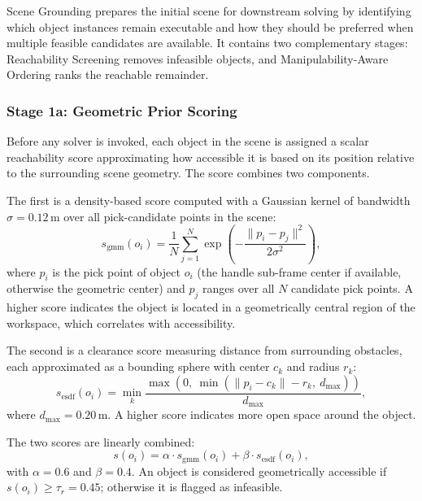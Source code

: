 \documentclass[journal]{IEEEtran}
\begin{document}
Scene Grounding prepares the initial scene for downstream solving by identifying which
object instances remain executable and how they should be preferred when multiple
feasible candidates are available. It contains two complementary stages:
Reachability Screening removes infeasible objects, and Manipulability-Aware Ordering
ranks the reachable remainder.

\subsubsection{Stage 1a: Geometric Prior Scoring}
\label{subsec:gmm_esdf}

Before any solver is invoked, each object in the scene is assigned a scalar
reachability score approximating how accessible it is based on its position relative
to the surrounding scene geometry. The score combines two components.

The first is a density-based score computed with a Gaussian kernel of bandwidth
$\sigma = 0.12\,\mathrm{m}$ over all pick-candidate points in the scene:
\begin{equation}
  s_{\mathrm{gmm}}(o_i) = \frac{1}{N} \sum_{j=1}^{N}
    \exp\!\left(-\frac{\|p_i - p_j\|^2}{2\sigma^2}\right),
  \label{eq:gmm_score}
\end{equation}
where $p_i$ is the pick point of object $o_i$ (the handle sub-frame center if
available, otherwise the geometric center) and $p_j$ ranges over all $N$ candidate
pick points. A higher score indicates the object is located in a geometrically central
region of the workspace, which correlates with accessibility.

The second is a clearance score measuring distance from surrounding obstacles, each
approximated as a bounding sphere with center $c_k$ and radius $r_k$:
\begin{equation}
  s_{\mathrm{esdf}}(o_i) = \min_k \frac{\max\!\left(0,\ \min\!\left(\|p_i - c_k\| - r_k,\ d_{\max}\right)\right)}{d_{\max}},
  \label{eq:esdf_score}
\end{equation}
where $d_{\max} = 0.20\,\mathrm{m}$. A higher score indicates more open space around
the object.

The two scores are linearly combined:
\begin{equation}
  s(o_i) = \alpha \cdot s_{\mathrm{gmm}}(o_i) + \beta \cdot s_{\mathrm{esdf}}(o_i),
  \label{eq:reach_score}
\end{equation}
with $\alpha = 0.6$ and $\beta = 0.4$. An object is considered geometrically
accessible if $s(o_i) \geq \tau_r = 0.45$; otherwise it is flagged as infeasible.
\end{document}
